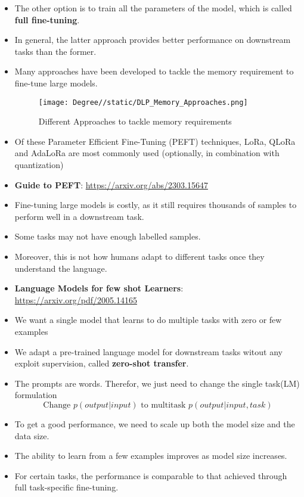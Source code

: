 \documentclass[a4paper]{article}
\begin{document}
\begin{itemize}
    \item The other option is to train all the parameters of the model, which is called \textbf{full fine-tuning}.
    \item In general, the latter approach provides better performance on downstream tasks than the former.
    \item Many approaches have been developed to tackle the memory requirement to fine-tune large models.
    \begin{figure}[H]
        \centering
        \texttt{[image: Degree//static/DLP\_Memory\_Approaches.png]}
        \caption{Different Approaches to tackle memory requirements}
    \end{figure}
    \item Of these Parameter Efficient Fine-Tuning (PEFT) techniques, LoRa, QLoRa and AdaLoRa are most commonly used (optionally, in combination with quantization)
    \item \textbf{Guide to PEFT}: \url{https://arxiv.org/abs/2303.15647}
    \item Fine-tuning large models is costly, as it still requires thousands of samples to perform well in a downstream task.
    \item Some tasks may not have enough labelled samples.
    \item Moreover, this is not how humans adapt to different tasks once they understand the language.
    \item \textbf{Language Models for few shot Learners}: \url{https://arxiv.org/pdf/2005.14165}
    \item We want a single model that learns to do multiple tasks with zero or few examples
    \item We adapt a pre-trained language model for downstream tasks witout any exploit supervision, called \textbf{zero-shot transfer}.
    \item The prompts are words. Therefor, we just need to change the single task(LM) formulation
    \begin{equation*}
        \text{Change }p(output|input)\text{ to multitask }p(output|input,task)
    \end{equation*}
    \item To get a good performance, we need to scale up both the model size and the data size.
    \item The ability to learn from a few examples improves as model size increases.
    \item For certain tasks, the performance is comparable to that achieved through full task-specific fine-tuning.

\end{itemize}
\end{document}
